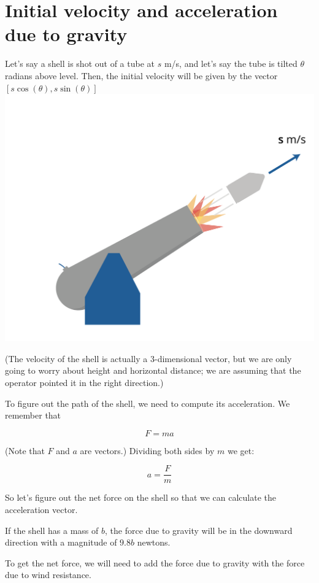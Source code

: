 \section{Initial velocity and acceleration due to gravity}

Let's say a shell is shot out of a tube at $s$ m/s, and let's say the tube
is tilted $\theta$ radians above level.  Then, the initial velocity
will be given by the vector $[s \cos(\theta), s \sin(\theta)]$
\includegraphics[width=1\textwidth]{cannonvi.png}



(The velocity of the shell is actually a 3-dimensional vector, but we
are only going to worry about height and horizontal distance; we are
assuming that the operator pointed it in the right direction.)

To figure out the path of the shell, we need to compute its acceleration. We remember that

$$F = m a$$

(Note that $F$ and $a$ are vectors.)  Dividing both sides by $m$ we get:

$$a = \frac{F}{m}$$

So let's figure out the net force on the shell so that we can calculate the acceleration vector.

If the shell has a mass of $b$, the force due to gravity will be in the
downward direction with a magnitude of $9.8 b$ newtons.

To get the net force, we will need to add the force due to gravity
with the force due to wind resistance.

